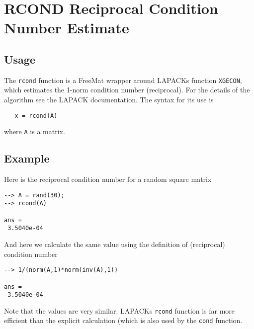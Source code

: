 \section{RCOND Reciprocal Condition Number Estimate}

\subsection{Usage}

The \verb|rcond| function is a FreeMat wrapper around LAPACKs
function \verb|XGECON|, which estimates the 1-norm condition
number (reciprocal).  For the details of the algorithm see
the LAPACK documentation.  The syntax for its use is
\begin{verbatim}
   x = rcond(A)
\end{verbatim}
where \verb|A| is a matrix.
\subsection{Example}

Here is the reciprocal condition number for a random square
matrix
\begin{verbatim}
--> A = rand(30);
--> rcond(A)

ans = 
 3.5040e-04 
\end{verbatim}
And here we calculate the same value using the definition of
(reciprocal) condition number
\begin{verbatim}
--> 1/(norm(A,1)*norm(inv(A),1))

ans = 
 3.5040e-04 
\end{verbatim}
Note that the values are very similar.  LAPACKs \verb|rcond|
function is far more efficient than the explicit calculation
(which is also used by the \verb|cond| function.
